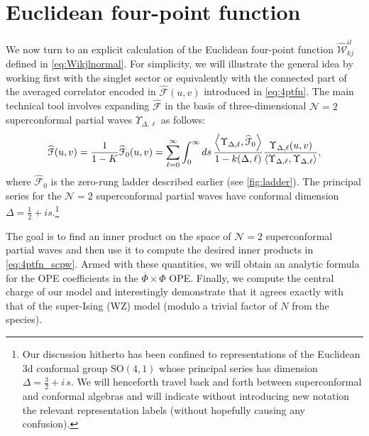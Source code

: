 \documentclass[11pt]{article}
\newcommand{\Phib}{\overline{\Phi}}
\begin{document}
\section{Euclidean four-point function}
\label{sec:4pt}

We now turn to an explicit calculation of the Euclidean four-point function $\widehat{\mathcal{W}}^{il}_{kj}$ defined in \eqref{eq:Wikjlnormal}.  For simplicity,  we will illustrate the general idea by working first with the singlet sector or equivalently with the connected part of the averaged correlator encoded in  $\widehat{\mathcal{F}}(u,v)$ introduced in  \eqref{eq:4ptfn}. The main technical tool involves expanding $\widehat{\mathcal{F}}$ in the basis of three-dimensional $\mathcal{N}=2$ superconformal partial waves $\Upsilon_{\Delta,\ell}$ as follows:
%
\begin{equation}\label{eq:4ptfn_scpw}
\widehat{\mathcal{F}}(u,v) = \frac{1}{1-K}\widehat{\mathcal{F}}_{0}(u,v) = \sum_{\ell = 0}^{\infty}\int_{0}^{\infty}ds\,\frac{\expval{\Upsilon_{\Delta,\ell},\widehat{\mathcal{F}}_{0}}}{1-k(\Delta,\ell)}\frac{\Upsilon_{\Delta,\ell}(u,v)}{\expval{ \Upsilon_{\Delta,\ell},\Upsilon_{\Delta,\ell}}},
\end{equation}
%
where $\widehat{\mathcal{F}}_{0}$ is the zero-rung ladder described earlier  (see \cref{fig:ladder}). The principal series for the $\mathcal{N}=2$ superconformal partial waves have conformal dimension $\Delta = \frac{1}{2}+is$.\footnote{Our discussion hitherto has been confined to representations of the Euclidean 3d conformal group $\mathrm{SO}(4,1)$ whose principal series has dimension $\Delta = \frac{3}{2} + i\, s$. We will henceforth travel back and forth between superconformal and conformal algebras and will indicate without introducing new notation the relevant representation labels (without hopefully causing any confusion). }

The goal is to find an inner product on the space of $\mathcal{N}=2$ superconformal partial waves and then use it to compute the desired inner products in \eqref{eq:4ptfn_scpw}. Armed with these quantities, we will obtain an analytic formula for the OPE coefficients in the $\Phib \times \Phi$ OPE. Finally, we compute the central charge of our model and interestingly demonstrate that it agrees exactly with that of the super-Ising (WZ) model  (modulo a trivial factor of $N$ from the species). 

\end{document}
